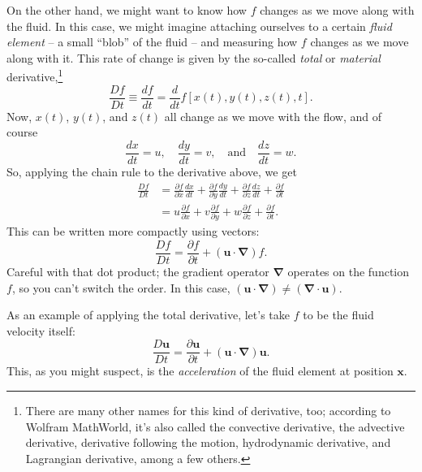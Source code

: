 On the other hand, we might want to know how $f$ changes as we move along with the fluid.  In this case, we might imagine attaching ourselves to a certain \emph{fluid element} -- a small ``blob'' of the fluid -- and measuring how $f$ changes as we move along with it.  This rate of change is given by the so-called \emph{total} or \emph{material} derivative,\footnote{There are many other names for this kind of derivative, too; according to Wolfram MathWorld, it's also called the convective derivative, the advective derivative, derivative following the motion, hydrodynamic derivative, and Lagrangian derivative, among a few others.}
\[
\frac{Df}{Dt} \equiv \frac{df}{dt} = \frac{d}{dt} f[x(t), y(t), z(t), t].
\]
Now, $x(t)$, $y(t)$, and $z(t)$ all change as we move with the flow, and of course
\[
\frac{dx}{dt} = u, \quad \frac{dy}{dt} = v, \quad \text{and} \quad \frac{dz}{dt} = w.
\]
So, applying the chain rule to the derivative above, we get
\begin{align*}
\frac{Df}{Dt} & =  \frac{\partial f}{\partial x}\frac{dx}{dt} + \frac{\partial f}{\partial y}\frac{dy}{dt} + \frac{\partial f}{\partial z}\frac{dz}{dt} + \frac{\partial f}{\partial t} \\
& = u \frac{\partial f}{\partial x} + v \frac{\partial f}{\partial y} + w \frac{\partial f}{\partial z} + \frac{\partial f}{\partial t}.
\end{align*}
This can be written more compactly using vectors:
\begin{equation}
\label{eq_total_deriv}
\boxed{
\frac{Df}{Dt} = \frac{\partial f}{\partial t} + (\mathbf{u} \cdot \boldsymbol{\nabla}) f.
}
\end{equation}
Careful with that dot product; the gradient operator $\boldsymbol{\nabla}$ operates on the function $f$, so you can't switch the order.  In this case, $(\mathbf{u} \cdot \boldsymbol{\nabla}) \neq (\boldsymbol{\nabla} \cdot \mathbf{u})$.

As an example of applying the total derivative, let's take $f$ to be the fluid velocity itself:
\begin{equation}
\label{eq_accel}
\boxed{
\frac{D\mathbf{u}}{Dt} = \frac{\partial \mathbf{u}}{\partial t} + (\mathbf{u} \cdot \boldsymbol{\nabla}) \mathbf{u}.
}
\end{equation}
This, as you might suspect, is the \emph{acceleration} of the fluid element at position $\mathbf{x}$.

